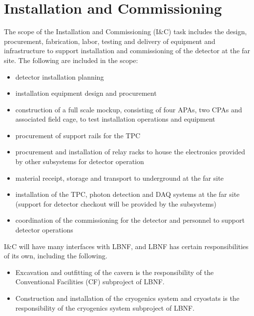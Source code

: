 \section{Installation and Commissioning}
\label{sec:detectors-fd-ref-install}

The scope of the Installation and Commissioning  (I\&C) task includes the
design, procurement, fabrication, labor, testing and delivery of
equipment and infrastructure to support installation and commissioning
of the detector at the far site. The following are included in the
scope:
\begin{itemize}
\item detector installation planning
\item installation equipment design and procurement
\item construction of a full scale mockup, consisting of four APAs, two CPAs and associated
  field cage, to test installation operations and
  equipment
\item procurement of support rails for the TPC
\item procurement and installation of relay racks to house the
  electronics provided by other subsystems for detector operation
\item material receipt, storage and transport to underground at the far site
\item installation of the TPC, photon detection and DAQ systems at the
  far site (support for detector checkout will be provided by the
  subsystems)
\item coordination of the commissioning for the detector and personnel
  to support detector operations
\end{itemize}

I\&C will have many interfaces with LBNF, and LBNF
has certain responsibilities of its own, including the following.
\begin{itemize}
\item Excavation and outfitting of the cavern is the responsibility of
  the Conventional Facilities (CF) subproject of LBNF.
\item Construction and installation of the cryogenics system and
  cryostats is the responsibility of the cryogenics system subproject
  of LBNF.
\end{itemize}


